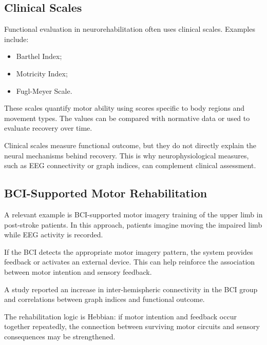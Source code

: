 \subsection{Clinical Scales}

Functional evaluation in neurorehabilitation often uses clinical scales. Examples include:

\begin{itemize}[noitemsep]
    \item Barthel Index;
    \item Motricity Index;
    \item Fugl-Meyer Scale.
\end{itemize}

These scales quantify motor ability using scores specific to body regions and movement types. The values can be compared with normative data or used to evaluate recovery over time.

\begin{authornote}
Clinical scales measure functional outcome, but they do not directly explain the neural mechanisms behind recovery. This is why neurophysiological measures, such as EEG connectivity or graph indices, can complement clinical assessment.
\end{authornote}

\subsection{BCI-Supported Motor Rehabilitation}

A relevant example is BCI-supported motor imagery training of the upper limb in post-stroke patients. In this approach, patients imagine moving the impaired limb while EEG activity is recorded.

If the BCI detects the appropriate motor imagery pattern, the system provides feedback or activates an external device. This can help reinforce the association between motor intention and sensory feedback.

A study reported an increase in inter-hemispheric connectivity in the BCI group and correlations between graph indices and functional outcome.

\begin{authornote}
The rehabilitation logic is Hebbian: if motor intention and feedback occur together repeatedly, the connection between surviving motor circuits and sensory consequences may be strengthened.
\end{authornote}

